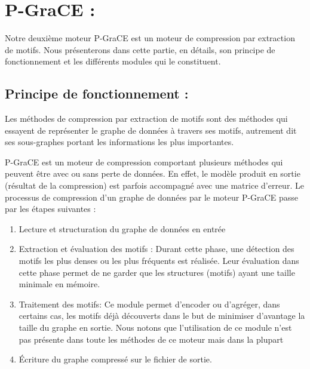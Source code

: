 \documentclass[a4paper,oneside,12pt]{report}
\theoremstyle{definition}
\begin{document}
	
	
	
	\section{P-GraCE :}
	
	Notre deuxième moteur \gls{P-GraCE} est un moteur de compression par extraction de motifs. Nous présenterons dans cette partie, en détails, son principe de fonctionnement et les différents modules qui le constituent.
	
		\subsection{Principe de fonctionnement :}
		
		Les méthodes de compression par extraction de motifs sont des méthodes qui essayent de représenter le graphe de données à travers ses motifs, autrement dit ses sous-graphes portant les informations les plus importantes. 
		
		
		
		P-GraCE est un moteur de compression comportant plusieurs méthodes qui peuvent être avec ou sans perte de données. 
		En effet, le modèle produit en sortie (résultat de la compression) est parfois accompagné avec une matrice d'erreur. Le processus de compression d'un graphe de données par le moteur P-GraCE passe par les étapes suivantes :
		
\begin{enumerate}

\item Lecture et structuration du graphe de données en entrée 

\item Extraction et évaluation des motifs : Durant cette phase, une détection des motifs les plus denses ou les plus fréquents est réalisée. Leur évaluation dans cette phase permet de ne garder que les structures (motifs) ayant une taille minimale en mémoire.

\item Traitement des motifs: Ce module permet d'encoder ou d'agréger, dans certains cas, les motifs déjà découverts dans le but de minimiser d'avantage la taille du graphe en sortie. Nous notons que l'utilisation de ce module n'est pas présente dans toute les méthodes de ce moteur mais dans la plupart 

\item Écriture du graphe compressé sur le fichier de sortie.
\end{enumerate}
\end{document}
